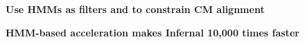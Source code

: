 \documentclass[landscape]{slides}
\begin{document}
\begin{slide}
\begin{slide}
\end{slide}
\begin{slide}
\begin{center}
\large
\textbf{Use HMMs as filters and to constrain CM alignment}
\end{center}


\vfill
\end{slide}
\begin{slide}
\begin{center}

\textbf{HMM-based acceleration makes Infernal 10,000 times faster}

\end{center}
\medskip



\end{slide}
\end{slide}
\end{document}
